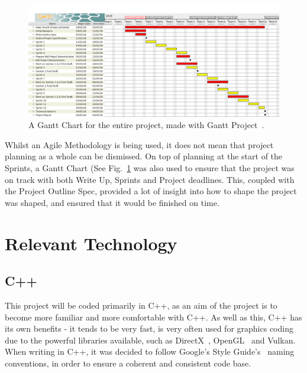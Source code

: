 \documentclass[a4paper,10pt]{report}
\begin{document}
\begin{figure}[h!]
    \centering
  \includegraphics[width=1\textwidth]{Images/Charts/GanttChart.png}
 \caption{A Gantt Chart for the entire project, made with Gantt Project~\cite{gantt}.}
 \label{fig:gantt_chart}
\end{figure}


Whilst an Agile Methodology is being used, it does not mean that project planning as a whole can be dismissed. On top of planning at the start of the Sprints, a Gantt Chart (See Fig.~\ref{fig:gantt_chart} was also used to ensure that the project was on track with both Write Up, Sprints and Project deadlines. This, coupled with the Project Outline Spec, provided a lot of insight into how to shape the project was shaped, and ensured that it would be finished on time. \medskip


\section{Relevant Technology}

\subsection{C++}

This project will be coded primarily in C++, as an aim of the project is to become more familiar and more comfortable with C++. As well as this, C++ has its own benefits - it tends to be very fast, is very often used for graphics coding due to the powerful libraries available, such as DirectX~\cite{directx_website}, OpenGL~\cite{OpenGL_website} and Vulkan. When writing in C++, it was decided to follow Google's Style Guide's~\cite{google_c_style_guide} naming conventions, in order to ensure a coherent and consistent code base.
\end{document}
